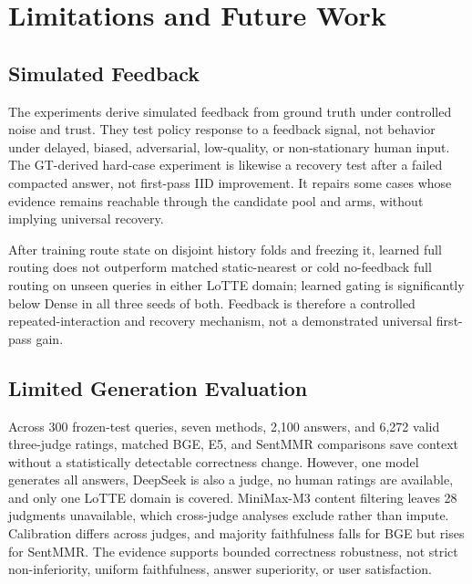 
\section{Limitations and Future Work}
\label{sec:08-limitations:limitations-and-future-work}

\subsection{Simulated Feedback}
\label{sec:08-limitations:simulated-feedback}

The experiments derive simulated feedback from ground truth under controlled noise and trust. They test policy response to a feedback signal, not behavior under delayed, biased, adversarial, low-quality, or non-stationary human input. The GT-derived hard-case experiment is likewise a recovery test after a failed compacted answer, not first-pass IID improvement. It repairs some cases whose evidence remains reachable through the candidate pool and arms, without implying universal recovery.

After training route state on disjoint history folds and freezing it, learned full routing does not outperform matched static-nearest or cold no-feedback full routing on unseen queries in either LoTTE domain; learned gating is significantly below Dense in all three seeds of both. Feedback is therefore a controlled repeated-interaction and recovery mechanism, not a demonstrated universal first-pass gain.

\subsection{Limited Generation Evaluation}
\label{sec:08-limitations:limited-generation-evaluation}

Across 300 frozen-test queries, seven methods, 2,100 answers, and 6,272 valid three-judge ratings, matched BGE, E5, and SentMMR comparisons save context without a statistically detectable correctness change. However, one model generates all answers, DeepSeek is also a judge, no human ratings are available, and only one LoTTE domain is covered. MiniMax-M3 content filtering leaves 28 judgments unavailable, which cross-judge analyses exclude rather than impute. Calibration differs across judges, and majority faithfulness falls for BGE but rises for SentMMR. The evidence supports bounded correctness robustness, not strict non-inferiority, uniform faithfulness, answer superiority, or user satisfaction.

